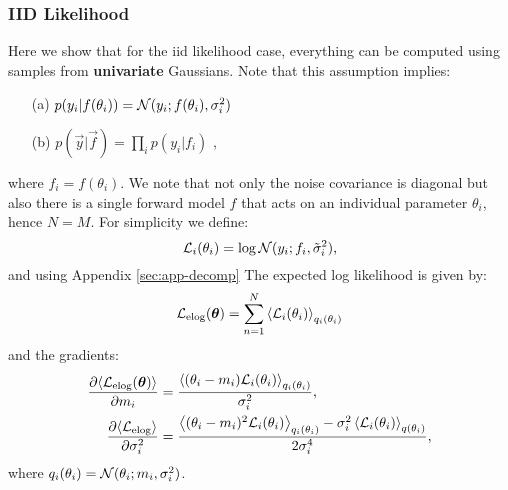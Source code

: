 \subsubsection{IID Likelihood}
Here we show that for the iid likelihood case, everything can be computed using samples from \textbf{univariate} Gaussians. Note 
that this assumption implies:
\begin{itemize}
\item[(a)]
$p(y_{i} | f(\theta_{i})) = \mathcal{N}(y_{i}; f(\theta_{i}), \sigma_{i}^{2})$
\item[(b)]
$p(\vec{y} | \vec{f}) = \prod_{i} p(y_{i} | f_{i})$ {,}
\end{itemize}
where $f_{i} = f(\theta_{i})$. We note that not only the noise covariance is diagonal but also there is a single forward model $f$ that acts on an individual parameter $\theta_{i}$, hence $N=M$.
For simplicity we define:
\begin{equation}
	\mathcal{L}_{i}(\theta_{i}) = \log \mathcal{N}(y_{i}; f_{i}, \tilde{\sigma}_{i}^{2}) \text{,}
\end{equation}
and using Appendix \ref{sec:app-decomp} 
The expected log likelihood is given by:
\begin{equation}
\mathcal{L}_{\text{{elog}}}(\boldsymbol{ \theta }) = \sum_{n=1}^{N} \left\langle  \mathcal{L}_{i}(\theta_{i})  \right\rangle_{q_{i}(\theta_{i})}
\end{equation}
%
and the gradients:
\begin{align}
	\frac{\partial{ \left\langle \mathcal{L}_{\text{{elog}}}(\boldsymbol{ \theta } ) \right\rangle}}{\partial{m_{i}}} &= \frac{ \left\langle (\theta_{i} - m_{i}) \mathcal{L}_{i}(\theta_{i}) \right\rangle_{q_{i}(\theta_{i})}}{\sigma_{i}^{2}}   \text{,} \\ 
\frac{\partial{\left\langle \mathcal{L}_{\text{{elog}}}\right\rangle}}{\partial{\sigma_{i}^{2}}} &= 
	\frac{   \left\langle (\theta_{i}-m_{i})^{2} \mathcal{L}_{i}(\theta_{i})  \right\rangle_{q_{i}(\theta_{i})}  - \sigma_{i}^{2} \left\langle \mathcal{L}_{i}(\theta_{i}) \right\rangle_{q(\theta_{i})}   }    {2 \sigma_{i}^{4}} \text{,}
\end{align}
where $q_{i}(\theta_{i}) = \mathcal{N}(\theta_{i}; m_{i}, \sigma_{i}^{2})$.
%
%
